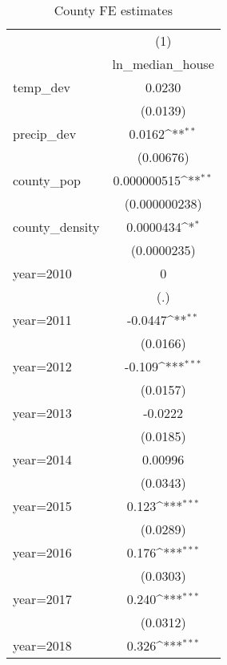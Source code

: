 \begin{table}[htbp]\centering
\def\sym#1{\ifmmode^{#1}\else\(^{#1}\)\fi}
\caption{County FE estimates}
\begin{tabular}{l*{1}{c}}
\hline\hline
                    &\multicolumn{1}{c}{(1)}\\
                    &\multicolumn{1}{c}{ln\_median\_house}\\
\hline
temp\_dev            &      0.0230         \\
                    &    (0.0139)         \\
[1em]
precip\_dev          &      0.0162\sym{**} \\
                    &   (0.00676)         \\
[1em]
county\_pop          & 0.000000515\sym{**} \\
                    &(0.000000238)         \\
[1em]
county\_density      &   0.0000434\sym{*}  \\
                    & (0.0000235)         \\
[1em]
year=2010           &           0         \\
                    &         (.)         \\
[1em]
year=2011           &     -0.0447\sym{**} \\
                    &    (0.0166)         \\
[1em]
year=2012           &      -0.109\sym{***}\\
                    &    (0.0157)         \\
[1em]
year=2013           &     -0.0222         \\
                    &    (0.0185)         \\
[1em]
year=2014           &     0.00996         \\
                    &    (0.0343)         \\
[1em]
year=2015           &       0.123\sym{***}\\
                    &    (0.0289)         \\
[1em]
year=2016           &       0.176\sym{***}\\
                    &    (0.0303)         \\
[1em]
year=2017           &       0.240\sym{***}\\
                    &    (0.0312)         \\
[1em]
year=2018           &       0.326\sym{***}\\

\end{tabular}
\end{table}
